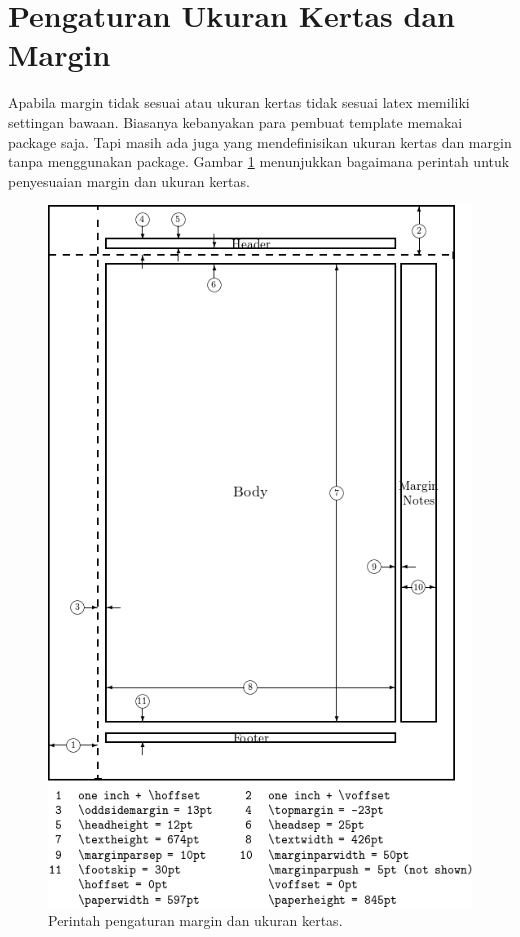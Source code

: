 \section{Pengaturan Ukuran Kertas dan Margin}
Apabila margin tidak sesuai atau ukuran kertas tidak sesuai latex memiliki settingan bawaan. Biasanya kebanyakan para pembuat template memakai package saja. Tapi masih ada juga yang mendefinisikan ukuran kertas dan margin tanpa menggunakan package. Gambar \ref{marginsize} menunjukkan bagaimana perintah untuk penyesuaian margin dan ukuran kertas.

  	\begin{figure}[ht]
  \centerline{\includegraphics[width=.5\textwidth]
  {figures/custommarginlatex.png}}
  \caption{Perintah pengaturan margin dan ukuran kertas.}
  \label{marginsize}
  \end{figure}


